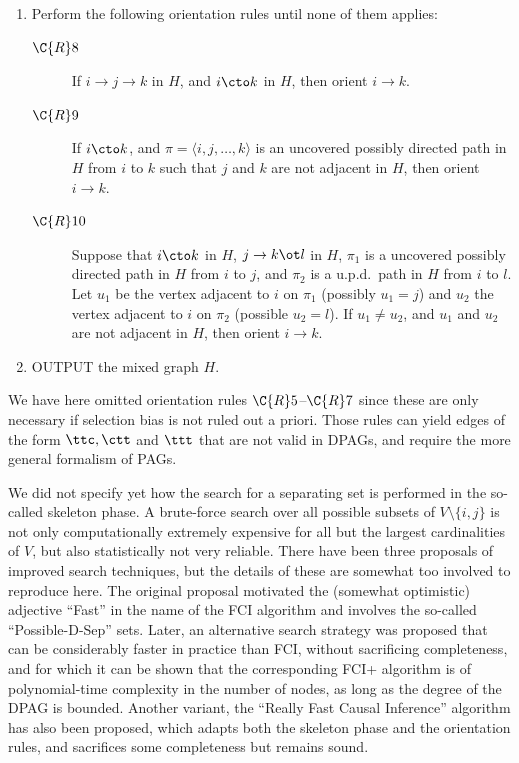 \begin{enumerate}
  \item Perform the following orientation rules until none of them applies:
    \begin{description}
      \item[$\C{R}8$] If $i \to j \to k$ in $H$, and $i \cto k$ in $H$, then orient $i \to k$.
      \item[$\C{R}9$] If $i \cto k$, and $\pi = \langle i, j, \dots, k \rangle$ is an uncovered possibly directed path in $H$ from $i$ to $k$ such that $j$ and $k$ are not adjacent in $H$, then orient $i \to k$.
      \item[$\C{R}10$] Suppose that $i \cto k$ in $H$, $j \to k \ot l$ in $H$, $\pi_1$ is a uncovered possibly directed path in $H$ from $i$ to $j$, and $\pi_2$ is a u.p.d.\ path in $H$ from $i$ to $l$. Let $u_1$ be the vertex adjacent to $i$ on $\pi_1$ (possibly $u_1 = j$) and $u_2$ the vertex adjacent to $i$ on $\pi_2$ (possible $u_2 = l$). If $u_1 \ne u_2$, and $u_1$ and $u_2$ are not adjacent in $H$, then orient $i \to k$.
    \end{description}
  \item OUTPUT the mixed graph $H$.
\end{enumerate}
We have here omitted orientation rules $\C{R}5$--$\C{R}7$ since these are only necessary if selection bias is not ruled out a
priori. 
Those rules can yield edges of the form $\ttc, \ctt$ and $\ttt$ that are not valid in DPAGs, and require the more general
formalism of PAGs.

We did not specify yet how the search for a separating set is performed in the so-called skeleton phase.
A brute-force search over all possible subsets of $V\setminus \{i,j\}$ is not only computationally extremely expensive for all but the largest cardinalities of $V$, but also statistically not very reliable.
There have been three proposals of improved search techniques, but the details of these are somewhat too involved to reproduce here.
The original proposal motivated the (somewhat optimistic) adjective ``Fast'' in the name of the FCI algorithm and involves the so-called ``Possible-D-Sep'' sets.
Later, an alternative search strategy was proposed that can be considerably faster in practice than FCI, without sacrificing completeness, and for which it can be shown that the corresponding FCI+ algorithm is of polynomial-time complexity in the number of nodes, as long as the degree of the DPAG is bounded.
Another variant, the ``Really Fast Causal Inference'' algorithm has also been proposed, which adapts both the skeleton phase and the orientation rules, and sacrifices some completeness but remains sound.

